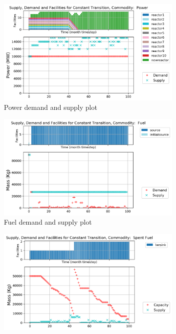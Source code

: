 \documentclass{anstrans}
\begin{document}
\begin{figure}[!htbp]
    \centering
    \begin{subfigure}[t]{\textwidth}
    \centering
        \includegraphics[width=0.9\linewidth]{figures/constanttransition-power.png} 
        \caption{Power demand and supply plot}
        \label{fig:constanttransition-power}
    \end{subfigure}
    \vspace{1cm}
    \begin{subfigure}[t]{0.45\textwidth}
        \centering
        \includegraphics[width=\linewidth]{figures/constanttransition-fuel.png} 
        \caption{Fuel demand and supply plot}
	    \label{fig:constanttransition-fuel}
    \end{subfigure}
    \hfill
    \begin{subfigure}[t]{0.45\textwidth}
        \centering
        \includegraphics[width=\linewidth]{figures/constanttransition-spentfuel.png} 

\end{subfigure}
\end{figure}
\end{document}
